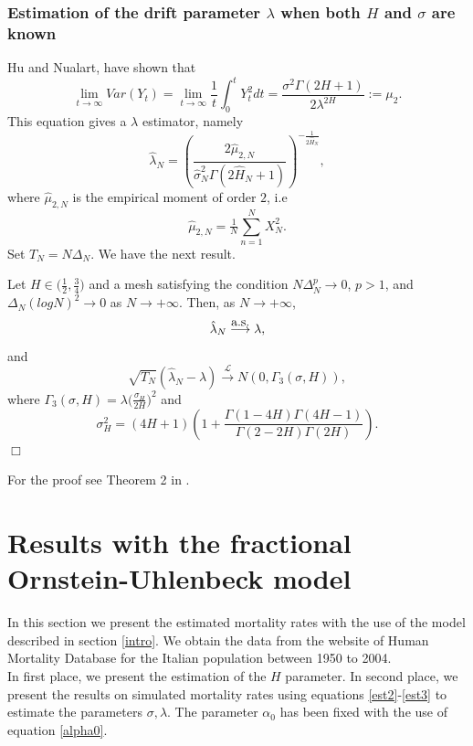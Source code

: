 \documentclass[smallextended]{svjour3}
\begin{document}
\subsubsection{Estimation of the drift parameter $\lambda$ when both $H$ and
$\sigma$ are known}

Hu and Nualart, \cite{hu-nu} have shown that
\[
\lim_{t\rightarrow \infty} Var (Y_t)= \lim_{t\rightarrow \infty}
\frac{1}{t}\int_0^t Y_t^2 dt = \frac{\sigma^2 \Gamma(2H+1) }
{2\lambda^{2H}}:=\mu_2.
\]
This equation gives a $\lambda$ estimator, namely
\begin{equation}
\hat{\lambda}_N = \left(\frac{2\hat{\mu}_{2,N}}{\hat{\sigma}_N^2
\Gamma(2\hat{H}_N+1) }  \right)^{-\tfrac{1}{2\hat{H}_N}},\label{est3}
\end{equation}
where $\hat{\mu}_{2,N}$ is the empirical moment of order $2$, i.e
\[
\hat{\mu}_{2,N} =\tfrac{1}{N}\sum_{n=1}^N X_N^2.
\]
Set $T_N=N\Delta_N$. We have the next result.
\begin{theorem}
    Let $H \in \big(\tfrac{1}{2} , \tfrac{3}{4}\big)$ and a mesh satisfying the
    condition $N \Delta_N^p\rightarrow 0$, $p>1$,
    and $ \Delta_N (log N )^2 \rightarrow 0$ as $N \rightarrow +\infty$. Then,
    as $N \rightarrow +\infty$,
    \[
    \hat{\lambda}_N \stackrel{\hbox{\rm a.s.}}{\longrightarrow}  \lambda,
    \]
    and
    \[
    \sqrt{T_N} ( \hat{\lambda}_N -\lambda)
    \stackrel{\mathcal{L}}{\longrightarrow} N (0, \Gamma_3 (\sigma,H)),
    \]
    where $\Gamma_3 (\sigma,H)=\lambda \big(\tfrac{\sigma_H}{2H} \big)^2$ and
    \[
    \sigma_H^2= (4H+1)\left(1+\frac{\Gamma(1-4H)\Gamma(4H-1)
    }{\Gamma(2-2H)\Gamma(2H)} \right).
    \]
    \hfill$\Box$
\end{theorem}
For the proof see Theorem 2 in \cite{br-ia}.\\

\section{Results with the fractional Ornstein-Uhlenbeck model}
\label{re-fou}

In this section we present the estimated mortality rates with the use of the
model
described in section \ref{intro}. We obtain the data from the website of Human
Mortality Database for the Italian population between 1950 to 2004.\\

In first place, we present the estimation of the $H$ parameter. In second
place, we present the results on simulated mortality rates using  equations
\eqref{est2}-\eqref{est3} to estimate the parameters $\sigma,\lambda$. The
parameter $\alpha_0$ has been fixed with the use of equation \eqref{alpha0}.\\
\end{document}
